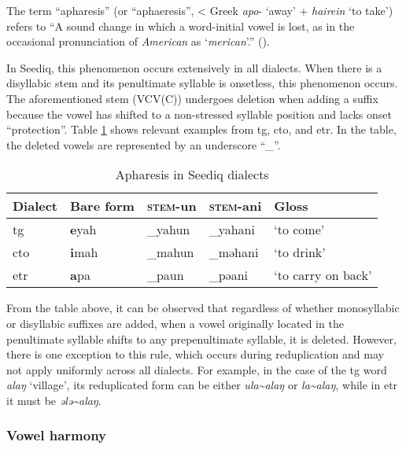 The term ``apharesis'' (or ``aphaeresis'', < Greek \textit{apo}- `away' + \textit{hairein} `to take') refers to ``A sound change in which a word-initial vowel is lost, as in the occasional pronunciation of \textit{American} as `\textit{merican}'.'' (\cite[13]{campbell2007HLglossary}).

In Seediq, this phenomenon occurs extensively in all dialects. When there is a disyllabic stem and its penultimate syllable is onsetless, this phenomenon occurs. The aforementioned stem (VCV(C)) undergoes deletion when adding a suffix because the vowel has shifted to a non-stressed syllable position and lacks onset ``protection''. Table \ref{tab:apharesis} shows relevant examples from \acl{tg}, \acl{cto}, and \acl{etr}. In the table, the deleted vowels are represented by an underscore ``\_''.

\begin{table}[!htbp]
\centering
\caption{Apharesis in Seediq dialects}
\label{tab:apharesis}
\begin{tabular}{lllll}
\hline
Dialect   & Bare form & \textsc{stem}-un & \textsc{stem}-ani & Gloss              \\ \hline
\acl{tg}  & \textbf{e}yah      & \_yahun          & \_yahani          & `to come'          \\
\acl{cto} & \textbf{i}mah      & \_mahun          & \_məhani          & `to drink'         \\
\acl{etr} & \textbf{a}pa       & \_paun           & \_pəani           & `to carry on back' \\ \hline
\end{tabular}
\end{table}

From the table above, it can be observed that regardless of whether monosyllabic or disyllabic suffixes are added, when a vowel originally located in the penultimate syllable shifts to any prepenultimate syllable, it is deleted. However, there is one exception to this rule, which occurs during reduplication and may not apply uniformly across all dialects. For example, in the case of the \acl{tg} word \textit{alaŋ} `village', its reduplicated form can be either \textit{ula\~{}alaŋ} or \textit{la\~{}alaŋ}, while in \acl{etr} it must be \textit{ələ\~{}alaŋ}.


\subsubsection{Vowel harmony} \label{sec:vhar}

